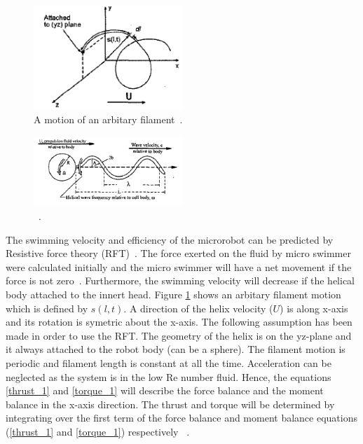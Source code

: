 \documentclass[12pt,a4paper,titlepage]{report}
\begin{document}
\begin{figure}
  \begin{center}
    \includegraphics[width=0.5\textwidth]{filament}
  \caption{A motion of an arbitary filament~\citep{edd2003biomimetic}.}
  \label{filament}
\end{center}
\end{figure}


\begin{figure}
  \begin{center}
    \includegraphics[width=0.5\textwidth]{motion}
  \caption{~\citep{edd2003biomimetic}.}
  \label{motion}
\end{center}
\end{figure}



The swimming velocity and efficiency of the microrobot can be predicted by Resistive force theory (RFT)~\citep{purcell1997efficiency}. 
The force exerted on the fluid by micro swimmer were calculated initially and the micro swimmer will have a net 
movement if the force is not zero~\citep{Doe:2013:Online}. Furthermore, the swimming velocity will decrease if the helical
body attached to the innert head. Figure \ref{filament} shows an arbitary filament motion which is defined by $s(l,t)$. 
A direction of the helix velocity ($U$) is along x-axis and its rotation is symetric about the x-axis. 
The following assumption has been made in order to use the RFT. The geometry
of the helix is on the yz-plane and it always attached to the robot body (can be a sphere). The 
filament motion is periodic and filament length is constant at all the time. Acceleration can be neglected as the
system is in the low Re number fluid. Hence, the equations \ref{thrust_1} and \ref{torque_1} will describe the force balance and 
the moment balance in the x-axis direction. The thrust and torque will be determined by integrating over the 
first term of the force balance and moment balance equations (\ref{thrust_1} and \ref{torque_1}) 
 respectively ~\citep{edd2003biomimetic}.
\end{document}
